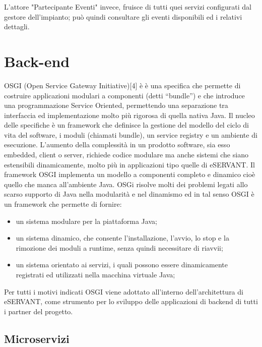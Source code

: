 L'attore "Partecipante Eventi" invece, fruisce di tutti quei servizi configurati dal gestore dell'impianto; può quindi consultare gli eventi disponibili ed
i relativi dettagli.

\section{Back-end}
OSGI (Open Service Gateway Initiative)[4] è  è una specifica che permette di costruire
applicazioni modulari a componenti (detti “bundle”) e che introduce una
programmazione Service Oriented, permettendo una separazione tra interfaccia ed
implementazione molto più rigorosa di quella nativa Java.
Il nucleo delle specifiche è un framework che definisce la gestione del modello del ciclo di vita del software, i moduli (chiamati bundle), un service registry e un ambiente di esecuzione. 
L’aumento della complessità in un prodotto software, sia esso embedded, client o server, richiede codice modulare ma anche sistemi che siano estensibili dinamicamente, molto più in applicazioni tipo quelle di eSERVANT. Il framework OSGI implementa un modello a componenti completo e dinamico cioè quello che manca all’ambiente Java. 
OSGi risolve molti dei problemi legati allo scarso supporto di Java nella modularità e nel dinamismo ed in tal senso OSGI è un framework che permette di fornire: 
\begin{itemize}
\item un sistema modulare per la piattaforma Java;
\item un sistema dinamico, che consente l’installazione, l’avvio, lo stop e la
rimozione dei moduli a runtime, senza quindi necessitare di riavvii;
\item un sistema orientato ai servizi, i quali possono essere dinamicamente
registrati ed utilizzati nella macchina virtuale Java;
\end{itemize}




Per tutti i motivi indicati OSGI viene adottato all’interno dell’architettura di eSERVANT,
come strumento per lo sviluppo delle applicazioni di backend di tutti i partner del
progetto.

\subsection{Microservizi}

